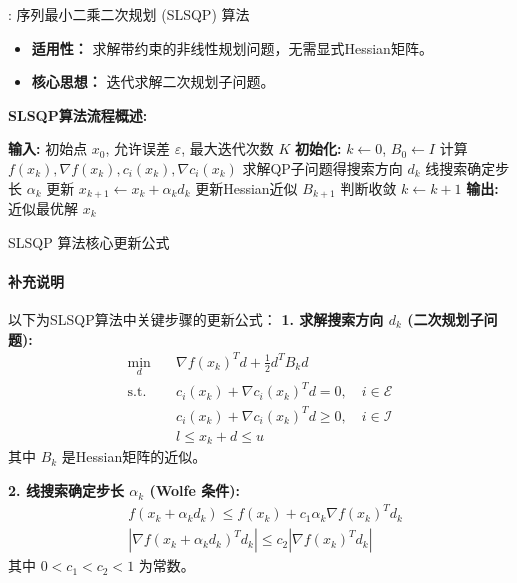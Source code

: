 \documentclass[9pt]{beamer}
\begin{document}
\begin{frame}{\insertsectionhead: 序列最小二乘二次规划 (SLSQP) 算法}
    \begin{itemize}
        \item \textbf{适用性：} 求解带约束的非线性规划问题，无需显式Hessian矩阵。
        \item \textbf{核心思想：} 迭代求解二次规划子问题。
    \end{itemize}
    \textbf{SLSQP算法流程概述:}
    \begin{algorithmic}[1]
        \State \textbf{输入:} 初始点 $x_0$, 允许误差 $\varepsilon$, 最大迭代次数 $K$
        \State \textbf{初始化:} $k \leftarrow 0$, $B_0 \leftarrow I$
            \State 计算 $f(x_k), \nabla f(x_k), c_i(x_k), \nabla c_i(x_k)$
            \State 求解QP子问题得搜索方向 $d_k$ 
            \State 线搜索确定步长 $\alpha_k$ 
            \State 更新 $x_{k+1} \leftarrow x_k + \alpha_k d_k$
            \State 更新Hessian近似 $B_{k+1}$ 
            \State 判断收敛
            \State $k \leftarrow k + 1$
        \EndWhile
        \State \textbf{输出:} 近似最优解 $x_k$
    \end{algorithmic}
\end{frame}

\begin{frame}{SLSQP 算法核心更新公式}
    \framesubtitle{补充说明}
    以下为SLSQP算法中关键步骤的更新公式：
    \vspace{0.5em}
    \textbf{1. 求解搜索方向 $d_k$ (二次规划子问题):}
    \begin{align*}
        \min_{d} \quad & \nabla f(x_k)^T d + \frac{1}{2}d^T B_k d \\
        \text{s.t.} \quad & c_i(x_k) + \nabla c_i(x_k)^T d = 0, \quad i \in \mathcal{E} \\
        & c_i(x_k) + \nabla c_i(x_k)^T d \geq 0, \quad i \in \mathcal{I} \\
        & l \leq x_k + d \leq u
    \end{align*}
    其中 $B_k$ 是Hessian矩阵的近似。
    
    \textbf{2. 线搜索确定步长 $\alpha_k$ (Wolfe 条件):}
    \begin{align*}
        & f(x_k + \alpha_k d_k) \leq f(x_k) + c_1 \alpha_k \nabla f(x_k)^T d_k \\
        & |\nabla f(x_k + \alpha_k d_k)^T d_k| \leq c_2 |\nabla f(x_k)^T d_k|
    \end{align*}
    其中 $0 < c_1 < c_2 < 1$ 为常数。
 
    
\end{frame}
\end{document}
